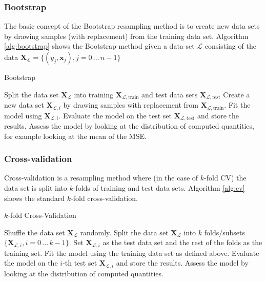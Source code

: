 \documentclass[a4paper]{article}
\newcommand{\XX}{\mathbf{X}}
\begin{document}
\subsubsection{Bootstrap}
The basic concept of the Bootstrap resampling method is to create new data sets by drawing samples (with replacement) from the training data set. Algorithm \ref{alg:bootstrap} shows the Bootstrap method given a data set $\mathcal{L}$ consisting of the data $\XX_{\mathcal{L}} = \{(y_j, \bm{x}_j), j= 0 \,...\, n-1\}$
\begin{algorithm}[H]
\caption{Bootstrap}
\begin{algorithmic}[1]
\State Split the data set $\XX_{\mathcal{L}}$ into training $\XX_{\mathcal{L},\text{train}}$ and test data sets $\XX_{\mathcal{L},\text{test}}$
\State Create a new data set $\XX_{\mathcal{L},i}$ by drawing samples with replacement from  $\XX_{\mathcal{L},\text{train}}$.
\State Fit the model using $\XX_{\mathcal{L},i}$.
\State Evaluate the model on the test set $\XX_{\mathcal{L},\text{test}}$ and store the results.
\EndFor
\State Assess the model by looking at the distribution of computed quantities, for example looking at the mean of the MSE.
\end{algorithmic}
\label{alg:bootstrap}
\end{algorithm}

\subsubsection{Cross-validation}
Cross-validation is a resampling method where (in the case of $k$-fold CV) the data set is split into $k$-folds of training and test data sets. Algorithm \ref{alg:cv} shows the standard $k$-fold cross-validation.
\begin{algorithm}[H]
\caption{$k$-fold Cross-Validation}
\begin{algorithmic}[1]
\State Shuffle the data set $\XX_{\mathcal{L}}$ randomly.
\State Split the data set $\XX_{\mathcal{L}}$ into $k$ folds/subsets $\{\XX_{\mathcal{L},i}, i=0\,...\,k-1\}$.
\State Set $\XX_{\mathcal{L},i}$ as the test data set and the rest of the folds as the training set.
\State Fit the model using the training data set as defined above.
\State Evaluate the model on the $i$-th test set $\XX_{\mathcal{L},i}$ and store the results.
\EndFor
\State Assess the model by looking at the distribution of computed quantities.%
\end{algorithmic}
\label{alg:cv}
\end{algorithm}
\end{document}
